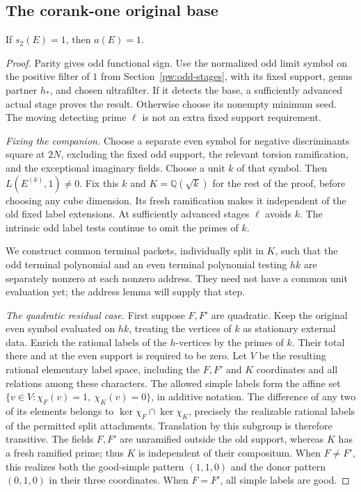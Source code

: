 \subsection{The corank-one original base}\label{pw:assembly-section}

\begin{proposition}\label{pw:odd-base}
If $s_2(E)=1$, then $a(E)=1$.
\end{proposition}

\begin{proof}
Parity gives odd functional sign.  Use the normalized odd limit symbol
on the positive filter of $1$ from Section~\ref{pw:odd-stages}, with
its fixed support, genus partner $h_*$, and chosen ultrafilter.  If it
detects the base, a sufficiently advanced actual stage proves the result.
Otherwise choose its nonempty minimum seed.  The moving detecting prime
$\ell$ is not an extra fixed support requirement.

\emph{Fixing the companion.}
Choose a separate even symbol for negative discriminants square at $2N$,
excluding the fixed odd support, the relevant torsion ramification, and
the exceptional imaginary fields.  Choose a unit $k$ of that symbol.
Then $L(E^{(k)},1)\ne0$.  Fix this $k$ and
$K=\mathbb Q(\sqrt{k})$ for the rest of the proof, before choosing any
cube dimension.  Its fresh ramification makes it independent of the old
fixed label extensions.  At sufficiently advanced stages $\ell$ avoids
$k$.  The intrinsic odd label tests continue to omit the primes of $k$.

We construct common terminal packets, individually split in $K$, such
that the odd terminal polynomial and an even terminal polynomial testing
$hk$ are separately nonzero at each nonzero address.  They need not have
a common unit evaluation yet; the address lemma will supply that step.

\emph{The quadratic residual case.}
First suppose $F,F'$ are quadratic.  Keep the original even symbol
evaluated on $hk$, treating the vertices of $k$ as stationary external
data.  Enrich the rational labels of the $h$-vertices by the primes of
$k$.  Their total there and at the even support is required to be zero.
Let $V$ be the resulting rational elementary label space, including the
$F,F'$ and $K$ coordinates and all relations among these characters.
The allowed simple labels form the affine set
$\{v\in V:\chi_F(v)=1,\ \chi_K(v)=0\}$, in additive notation.
The difference of any two of its elements belongs to
$\ker\chi_F\cap\ker\chi_K$, precisely the realizable rational labels
of the permitted split attachments.  Translation by this subgroup is
therefore transitive.  The fields $F,F'$ are unramified outside the old
support, whereas $K$ has a fresh ramified prime; thus $K$ is independent
of their compositum.  When $F\ne F'$, this realizes both the good-simple
pattern $(1,1,0)$ and the donor pattern $(0,1,0)$ in their three
coordinates.  When $F=F'$, all simple labels are good.


\end{proof}
